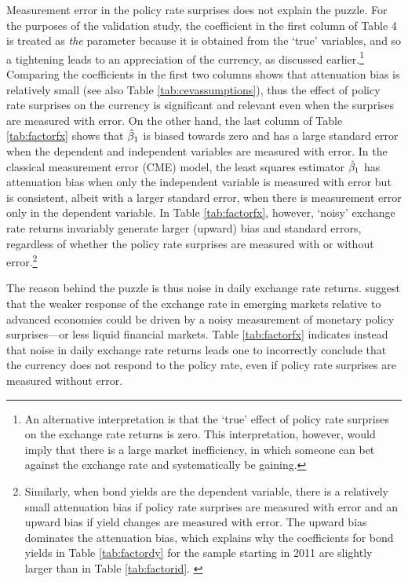\documentclass[a4paper,12pt]{article} 		%
\begin{document}
Measurement error in the policy rate surprises does not explain the puzzle. For the purposes of the validation study, the coefficient in the first column of Table 4 is treated as \textit{the} parameter because it is obtained from the `true' variables, and so a tightening leads to an appreciation of the currency, as discussed earlier.\footnote{An alternative interpretation is that the `true’ effect of policy rate surprises on the exchange rate returns is zero. This interpretation, however, would imply that there is a large market inefficiency, in which someone can bet against the exchange rate and systematically be gaining.} Comparing the coefficients in the first two columns shows that attenuation bias is relatively small (see also Table \ref{tab:cevassumptions}), thus the effect of policy rate surprises on the currency is significant and relevant even when the surprises are measured with error. On the other hand, the last column of Table \ref{tab:factorfx} shows that \(\hat{\beta}_{1}\) is biased towards zero and has a large standard error when the dependent and independent variables are measured with error. In the classical measurement error (CME) model, the least squares estimator \(\hat{\beta}_{1}\) has attenuation bias when only the independent variable is measured with error but is consistent, albeit with a larger standard error, when there is measurement error only in the dependent variable. In Table \ref{tab:factorfx}, however, `noisy' exchange rate returns invariably generate larger (upward) bias and standard errors, regardless of whether the policy rate surprises are measured with or without error.\footnote{Similarly, when bond yields are the dependent variable, there is a relatively small attenuation bias if policy rate surprises are measured with error and an upward bias if yield changes are measured with error. The upward bias dominates the attenuation bias, which explains why the coefficients for bond yields in Table \ref{tab:factordy} for the sample starting in 2011 are slightly larger than in Table \ref{tab:factorid}. \label{fn:factoryc}} 

The reason behind the puzzle is thus noise in daily exchange rate returns. \textcite{PenningsRamayandiTang:2015} suggest that the weaker response of the exchange rate in emerging markets relative to advanced economies could be driven by a noisy measurement of monetary policy surprises---or less liquid financial markets. Table \ref{tab:factorfx} indicates instead that noise in daily exchange rate returns leads one to incorrectly conclude that the currency does not respond to the policy rate, even if policy rate surprises are measured without error. 
\end{document}
